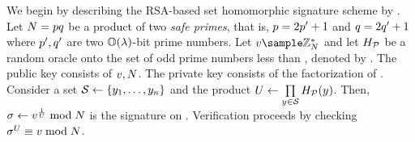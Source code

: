 \iffalse 
We begin by describing the RSA-based set 
homomorphic signature scheme by \citet{johnson2002homomorphic}. Let $\rsaMod = \safePrime[1] 
\safePrime[2]$ be a product of two 
\textit{safe primes}, that is, $\safePrime[1] = 2 \sgPrime[1] + 1$ and $\safePrime[2] = 2 
\sgPrime[2] + 1$ where $\sgPrime[1], \sgPrime[2]$ are two $\mathbb{O}(\lambda)$-bit prime numbers. 
Let $\genericRSAElmt \sample \integersModNInv$ and 
let $H_{\mathcal{P}}$ be a random oracle onto the set of odd prime numbers less than \rsaMod, denoted by 
\primes. The public 
key consists of $\genericRSAElmt, \rsaMod$. The private key consists of the factorization of 
\rsaMod. Consider a set $\genericSetVar \gets \setDefn{\genericCInputElmt{1}, \dots, 
\genericCInputElmt{\genericSetSize}}$ and the product $\accSet \gets \prod\limits_{\genericCInputElmt 
\in \genericSetVar} \primeRO(\genericCInputElmt)$. Then, $\genericSig 
\gets \genericRSAElmt^{\frac{1}{\accSet}} \bmod \rsaMod$ is the signature on \genericSetVar . 
Verification 
proceeds by checking $\genericSig^{\accSet} \equiv \genericRSAElmt \bmod \rsaMod$. 

